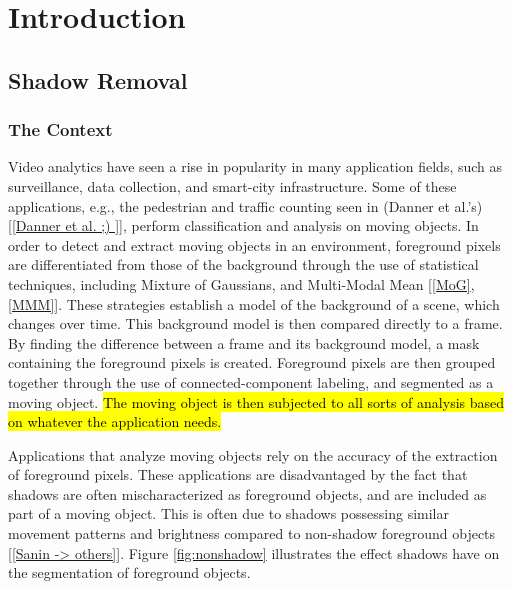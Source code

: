 \documentclass[12pt]{report}
\begin{document}
\doublespacing

\clearpage
\chapter{Introduction}

\section{Shadow Removal}

\subsection{The Context}

Video analytics have seen a rise in popularity in many application fields, such as surveillance, data collection, and smart-city infrastructure. Some of these applications, e.g., the pedestrian and traffic counting seen in (Danner et al.'s) [\ref{Danner et al. ;) }], perform classification and analysis on moving objects. In order to detect and extract moving objects in an environment, foreground pixels are differentiated from those of the background through the use of statistical techniques, including Mixture of Gaussians, and Multi-Modal Mean [\ref{MoG}, \ref{MMM}]. These strategies establish a model of the background of a scene, which changes over time. This background model is then compared directly to a frame. By finding the difference between a frame and its background model, a mask containing the foreground pixels is created. Foreground pixels are then grouped together through the use of connected-component labeling, and segmented as a moving object. \hl{The moving object is then subjected to all sorts of analysis based on whatever the application needs.}

Applications that analyze moving objects rely on the accuracy of the extraction of foreground pixels. These applications are disadvantaged by the fact that shadows are often mischaracterized as foreground objects, and are included as part of a moving object. This is often due to shadows possessing similar movement patterns and brightness compared to non-shadow foreground objects [\ref{Sanin -> others}]. Figure \ref{fig:nonshadow} illustrates the effect shadows have on the segmentation of foreground objects. 
\end{document}
